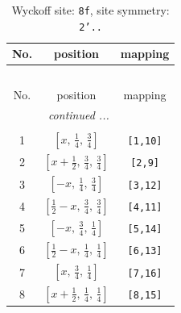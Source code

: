 \documentclass[fleqn,8pt]{jsarticle}
\begin{document}
\begin{longtable}{ccc}
\caption{Wyckoff site: {\tt 8f}, site symmetry: {\tt 2'..}}
 \\
 \hline \hline
No. & position & mapping \\ \hline \endfirsthead

\multicolumn{2}{l}{\tablename\ \thetable{}} \\
 \hline \hline
No. & position & mapping \\ \hline \endhead

 \hline \hline
\multicolumn{2}{r}{\footnotesize\it continued ...} \\ \endfoot

 \hline \hline
\multicolumn{2}{r}{} \\ \endlastfoot

1 & $\left[ x,\, \frac{1}{4},\, \frac{3}{4} \right]$ & {\tt [1,10]} \\ \hline
2 & $\left[ x + \frac{1}{2},\, \frac{3}{4},\, \frac{3}{4} \right]$ & {\tt [2,9]} \\ \hline
3 & $\left[ - x,\, \frac{1}{4},\, \frac{3}{4} \right]$ & {\tt [3,12]} \\ \hline
4 & $\left[ \frac{1}{2} - x,\, \frac{3}{4},\, \frac{3}{4} \right]$ & {\tt [4,11]} \\ \hline
5 & $\left[ - x,\, \frac{3}{4},\, \frac{1}{4} \right]$ & {\tt [5,14]} \\ \hline
6 & $\left[ \frac{1}{2} - x,\, \frac{1}{4},\, \frac{1}{4} \right]$ & {\tt [6,13]} \\ \hline
7 & $\left[ x,\, \frac{3}{4},\, \frac{1}{4} \right]$ & {\tt [7,16]} \\ \hline
8 & $\left[ x + \frac{1}{2},\, \frac{1}{4},\, \frac{1}{4} \right]$ & {\tt [8,15]} \\
\end{longtable}
\renewcommand{\arraystretch}{1.2}
\end{document}

